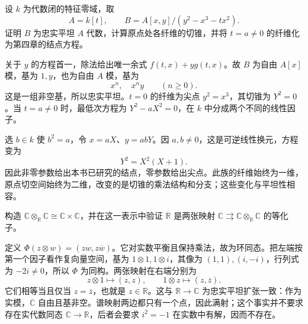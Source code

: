 \begin{exercise}\label{g5:ex:cusp-node-flat-family}
	设 \(k\) 为代数闭的特征零域，取
	\[
		A=k[t],\qquad B=A[x,y]/(y^2-x^3-tx^2).
	\]
	证明 \(B\) 为忠实平坦 \(A\) 代数，计算原点处各纤维的切锥，并将 \(t=a\ne0\) 的纤维化为第四章的结点方程。
\end{exercise}
\begin{solution}
	关于 \(y\) 的方程首一，除法给出唯一余式 \(f(t,x)+y g(t,x)\)。故 \(B\) 为自由 \(A[x]\) 模，基为 \(1,y\)，也为自由 \(A\) 模，基为
	\[
		x^n,\quad x^ny\qquad(n\geq0).
	\]
	这是一组非空基，所以忠实平坦。\(t=0\) 的纤维为尖点 \(y^2=x^3\)，其切锥为 \(Y^2=0\)。当 \(t=a\ne0\) 时，最低次方程为 \(Y^2-aX^2=0\)，在 \(k\) 中分成两个不同的线性因子。

	选 \(b\in k\) 使 \(b^2=a\)，令 \(x=aX\)、\(y=abY\)。因 \(a,b\ne0\)，这是可逆线性换元，方程变为
	\[
		Y^2=X^2(X+1).
	\]
	因此非零参数给出本书已研究的结点，零参数给出尖点。此族的纤维始终为一维，原点切空间始终为二维，改变的是切锥的乘法结构和分支；这些变化与平坦性相容。
\end{solution}

\begin{exercise}\label{g5:ex:complex-faithful-equalizer}
	构造 \(\mathbb C\otimes_{\mathbb R}\mathbb C\cong\mathbb C\times\mathbb C\)，并在这一表示中验证 \(\mathbb R\) 是两张映射
	\(\mathbb C\rightrightarrows\mathbb C\otimes_{\mathbb R}\mathbb C\)
	的等化子。
\end{exercise}
\begin{solution}
	定义 \(\Phi(z\otimes w)=(zw,z\overline w)\)。它对实数平衡且保持乘法，故为环同态。把左端按第一个因子看作复向量空间，基为 \(1\otimes1,1\otimes i\)，其像为 \((1,1),(i,-i)\)，行列式为 \(-2i\ne0\)，所以 \(\Phi\) 为同构。两张映射在右端分别为
	\[
		z\otimes1\longmapsto(z,z),\qquad
		1\otimes z\longmapsto(z,\overline z).
	\]
	它们相等当且仅当 \(z=\overline z\)，也就是 \(z\in\mathbb R\)。这与 \(\mathbb R\to\mathbb C\) 为忠实平坦扩张一致：作为实模，\(\mathbb C\) 自由且基非空。谱映射两边都只有一个点，因此满射；这个事实并不要求存在实代数同态 \(\mathbb C\to\mathbb R\)，后者会要求 \(i^2=-1\) 在实数中有解，因而不存在。
\end{solution}
